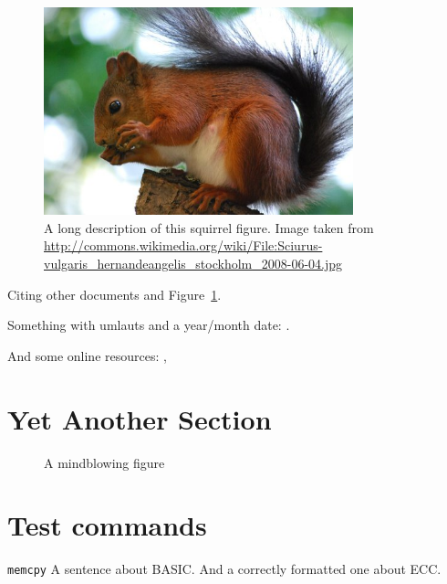 \begin{figure}[tbp]
  \centering
  \includegraphics[width=0.8\textwidth]{images/squirrel}
  \caption[Short description]{A long description of this squirrel figure.
  Image taken from
  \url{http://commons.wikimedia.org/wiki/File:Sciurus-vulgaris_hernandeangelis_stockholm_2008-06-04.jpg}}
  \label{fig:squirrel}
\end{figure}

Citing \cite{bellard2005qfa} other documents \cite{bellard2005qfa, boileau06}
and Figure~\ref{fig:squirrel}.

Something with umlauts and a year/month date:
\cite{becher04:_feurig_hacken_mit_firew}.

And some online resources: \cite{green04}, \cite{patent:4819234}

\section{Yet Another Section}


\begin{figure}[tbp]
 \caption{A mindblowing figure}
 \label{fig:todo}
\end{figure}

\section{Test commands}

\drops \LLinux \NOVA \QEMU
\texttt{memcpy}
A sentence about BASIC. And a correctly formatted one about ECC\@.

\cleardoublepage

